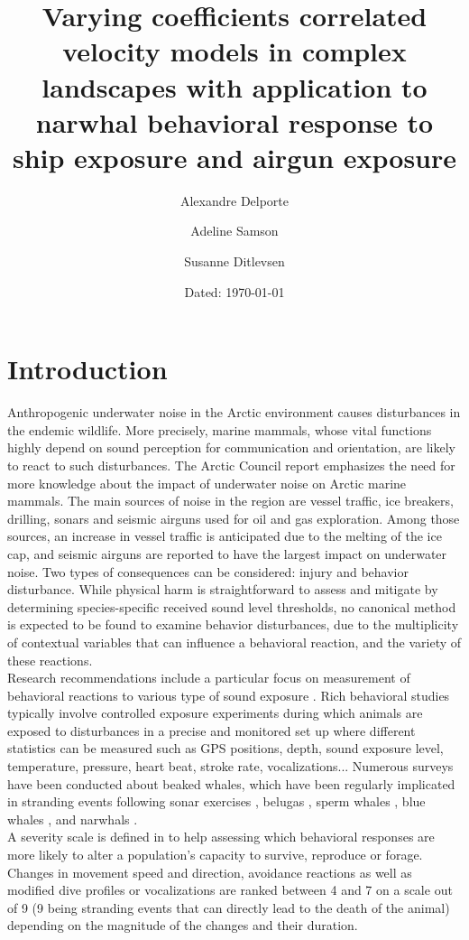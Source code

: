 \documentclass[11pt]{article}
\title{
 \textbf{Varying coefficients correlated velocity models in complex landscapes with application to narwhal behavioral response to ship exposure and airgun exposure}}
\author[1]{Alexandre Delporte}
\author[1]{Adeline Samson}
\author[2]{Susanne Ditlevsen}
\affil[1]{Laboratoire Jean Kuntzmann, Université Grenoble-Alpes, France \authorcr
	\{\tt alexandre.delporte, adeline.samson\}@univ-grenoble-alpes.fr}
\affil[2]{Department of Statistics, University of Copenhagen, Denmark \authorcr
	\tt  susanne@math.ku.dk}
\date{Dated: \today}
\newcommand {\1}{\mathbb{1}}
\begin{document}
\maketitle


\newpage

\section{Introduction}


Anthropogenic underwater noise in the Arctic environment causes disturbances in the endemic wildlife. More precisely, marine mammals, whose vital functions highly depend on sound perception for communication and orientation, are likely to react to such disturbances. The Arctic Council report \cite{halliday_underwater_2020} emphasizes the need for more knowledge about the impact of underwater noise on Arctic marine mammals. The main sources of noise in the region are vessel traffic, ice breakers, drilling, sonars and seismic airguns used for oil and gas exploration. Among those sources, an increase in vessel traffic is anticipated due to the melting of the ice cap, and seismic airguns are reported to have the largest impact on underwater noise. Two types of consequences can be considered: injury and behavior disturbance. While physical harm is straightforward to assess and mitigate by determining species-specific received sound level thresholds, no canonical method is expected to be found to examine behavior disturbances, due to the multiplicity of contextual variables that can influence a behavioral reaction, and the variety of these reactions.\\
Research recommendations include a particular focus on measurement of behavioral reactions to various type of sound exposure \cite{southall_marine_2008,southall_marine_2019}. Rich behavioral studies typically involve controlled exposure experiments during which animals are exposed to disturbances in a precise and monitored set up where different  statistics can be measured such as GPS positions, depth, sound exposure level, temperature, pressure, heart beat, stroke rate, vocalizations... Numerous surveys have been conducted about beaked whales, which have been regularly implicated in stranding events following sonar exercises \cite{tyack_beaked_2011,cioffi_trade-offs_2022}, belugas \cite{martin_exposure_2023}, sperm whales \cite{madsen_quantitative_2006}, blue whales \cite{friedlaender_preymediated_2016}, and narwhals \cite{heide-jorgensen_behavioral_2021,tervo_narwhals_2021}. \\
A severity scale is defined in \cite{southall_marine_2008} to help assessing which behavioral responses are more likely to alter a population's capacity to survive, reproduce or forage. Changes in movement speed and direction, avoidance reactions as well as modified dive profiles or vocalizations  are ranked between 4 and 7 on a scale out of 9 (9 being stranding events that can directly lead to the death of the animal) depending on the magnitude of the changes and their duration.\\
\end{document}

